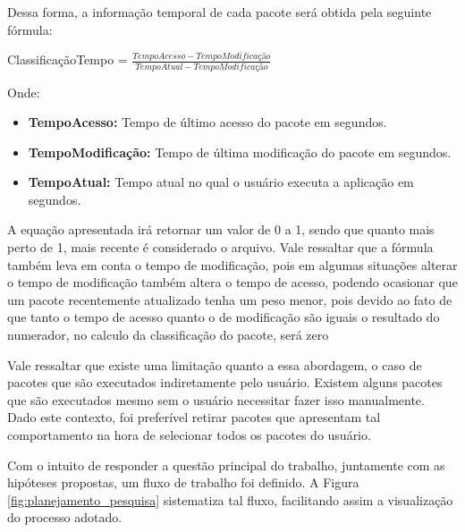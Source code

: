 Dessa forma, a informação temporal de cada pacote será obtida pela seguinte
fórmula:

ClassificaçãoTempo = $\frac{TempoAcesso - TempoModificação}{TempoAtual -
TempoModificação}$


Onde:

\begin{itemize}
    \item \textbf{TempoAcesso:} Tempo de último acesso do pacote em segundos.
    \item \textbf{TempoModificação:} Tempo de última modificação do pacote em
        segundos.
    \item \textbf{TempoAtual:} Tempo atual no qual o usuário executa a
        aplicação em segundos.
\end{itemize}


A equação apresentada irá retornar um valor de 0 a 1, sendo que quanto mais
perto de 1, mais recente é considerado o arquivo. Vale ressaltar que a fórmula
também leva em conta o tempo de modificação, pois em algumas situações alterar o
tempo de modificação também altera o tempo de acesso, podendo ocasionar que um
pacote recentemente atualizado tenha um peso menor, pois devido ao fato de que
tanto o tempo de acesso quanto o de modificação são iguais o resultado do
numerador, no calculo da classificação do pacote, será zero

Vale ressaltar que existe uma limitação quanto a essa abordagem, o caso de
pacotes que são executados indiretamente pelo usuário. Existem alguns pacotes
que são executados mesmo sem o usuário necessitar fazer isso manualmente. Dado
este contexto, foi preferível retirar pacotes que apresentam tal comportamento
na hora de selecionar todos os pacotes do usuário.


Com o intuito de responder a questão principal do trabalho, juntamente com as
hipóteses propostas, um fluxo de trabalho foi definido. A Figura
\ref{fig:planejamento_pesquisa} sistematiza tal fluxo, facilitando assim a visualização do processo adotado.

